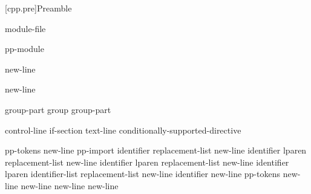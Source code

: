 \documentclass{wg21}
\begin{document}
%
%


[cpp.pre]{Preamble}

\begin{bnf}
    \br
    \br
    module-file
\end{bnf}

\begin{bnf}
    \br
     pp-module  
\end{bnf}

\begin{bnf}
    \br
     \terminal{;} new-line 
\end{bnf}

\begin{bnf}
    \br
     \terminal{:}  \terminal{;} new-line 
\end{bnf}

\begin{bnf}
    \br
    group-part\br
    group group-part
\end{bnf}

\begin{bnf}
    \br
    control-line\br
    if-section\br
    text-line\br
    \terminal{\#} conditionally-supported-directive
\end{bnf}

\begin{bnf}\obeyspaces
    \br
     pp-tokens new-line\br
    pp-import\br
     identifier replacement-list new-line\br
     identifier lparen  \terminal{)} replacement-list new-line\br
     identifier lparen  replacement-list new-line\br
     identifier lparen identifier-list  replacement-list new-line\br
     identifier new-line\br
     pp-tokens new-line\br
      new-line\br
      new-line\br
    \terminal{\# }new-line
\end{bnf}
\end{document}
